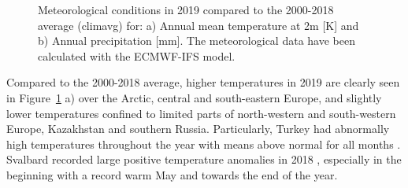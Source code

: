 \begin{figure}[h]
  \caption{Meteorological conditions in 2019 compared to the 2000-2018 average (climavg) for: a) Annual mean temperature at 2m [K] and b) Annual precipitation [mm]. The meteorological data have been calculated with the ECMWF-IFS model.}
\label{fig:metyear-avMET}
\end{figure}

Compared to the 2000-2018 average, higher temperatures in 2019 are clearly seen in Figure~\ref{fig:metyear-avMET} a) over the Arctic, central and south-eastern Europe, and slightly lower temperatures 
confined to limited parts of north-western and south-western Europe, Kazakhstan and southern Russia. Particularly, Turkey had abnormally high temperatures throughout the year with means above normal for all months \citep{Sensoy:Turkey2018}.
Svalbard recorded large positive temperature anomalies in 2018 \citep{Overland:ARC2018}, especially in the beginning with a record warm May and towards the end of the year.


